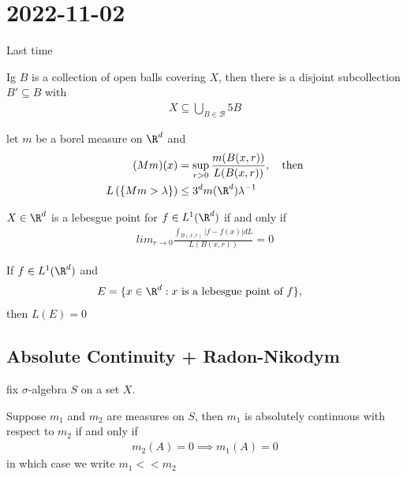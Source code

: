\section{2022-11-02}

Last time

\begin{theorem}[Vitali]
	Ig $B$ is a collection of open balls covering $X$, then there is a disjoint subcollection $B' \subseteq B$ with 
	\begin{align*}
		X \subseteq \bigcup_{B \in \mathcal{B}} 5 B
	\end{align*} 
\end{theorem}

\begin{theorem}
	let $m$ be a borel measure on $\R^{d}$ and 
	\begin{align*}
		(M m )(x) &= \sup_{r > 0} \frac{m (B(x, r))}{L (B(x,r))}, \quad \text{then} \\
		L\left( \{ M m > \lambda \} \right) &\leq 3^{d} m (\R^d) \lambda^{-1}
	\end{align*} 
\end{theorem}

\begin{definition}
	$X \in \R^{d}$ is a lebesgue point for $f \in L^{1} ( \R^{d} )$ if and only if
	\begin{align*}
		lim_{r \to 0} \frac{\int_{B(x, r)} | f - f(x) | dL}{L (B(x, r))} = 0
	\end{align*} 
\end{definition}

\begin{definition}
	If $f \in L^{1}( \R^{d})$ and
	\begin{align*}
		&E = \{ x \in \R^{d} : x \text{ is a lebesgue point of } f \},
	\end{align*} then
	$L(E) = 0$
	
\end{definition}



\subsection{Absolute Continuity + Radon-Nikodym}

fix $\sigma$-algebra $S$ on a set $X$.


\begin{definition}
	Suppose $m_1$ and $m_{2}$ are measures on $S$, then $m_1$ is absolutely continuous with respect to $m_{2}$ if and only if 
	\begin{align*}
		m_{2} (A) = 0 \implies m_1 (A) = 0
	\end{align*} in which case we write $m_1 << m_2$
\end{definition}

